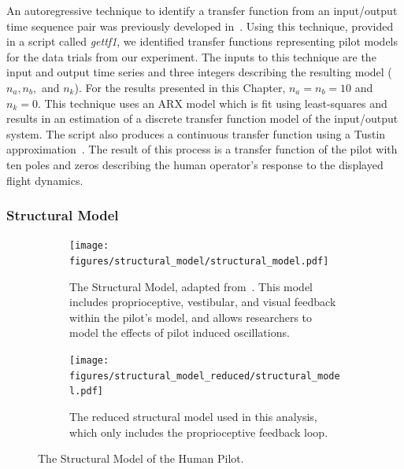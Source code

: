 An autoregressive technique to identify a transfer function from an input/output time sequence pair was previously developed in~\citet{hess_modeling_2002}.
Using this technique, provided in a script called \textit{gettf1}, we identified transfer functions representing pilot models for the data trials from our experiment.
The inputs to this technique are the input and output time series and three integers describing the resulting model ($n_a, n_b,$ and $n_k$).
For the results presented in this Chapter, $n_a = n_b = 10$ and $n_k = 0$.
This technique uses an ARX model which is fit using least-squares and results in an estimation of a discrete transfer function model of the input/output system.
The script also produces a continuous transfer function using a Tustin approximation~\cite{tustin1947method}.
The result of this process is a transfer function of the pilot with ten poles and zeros describing the human operator's response to the displayed flight dynamics.

\subsubsection{Structural Model}
\begin{figure}[tbp]
    \centering
    \begin{subfigure}{\textwidth}
        \centering
        \texttt{[image: figures/structural\_model/structural\_model.pdf]}
        \caption[The Structural Model]{The Structural Model, adapted from~\citet{hess_unified_1997}. This model includes proprioceptive, vestibular, and visual feedback within the pilot's model, and allows researchers to model the effects of pilot induced oscillations.}
        \label{fig:structuralmodel}
    \end{subfigure}
    \hfill
    \begin{subfigure}{\textwidth}
        \centering
        \texttt{[image: figures/structural\_model\_reduced/structural\_model.pdf]}
        \caption[The reduced structural model used in this analysis]{The reduced structural model used in this analysis, which only includes the proprioceptive feedback loop.}
        \label{fig:structuralmodelreduced}
    \end{subfigure}
    \caption[The Structural Model of the Human Pilot]{The Structural Model of the Human Pilot.}
    \label{fig:structuralmodels}
\end{figure}

